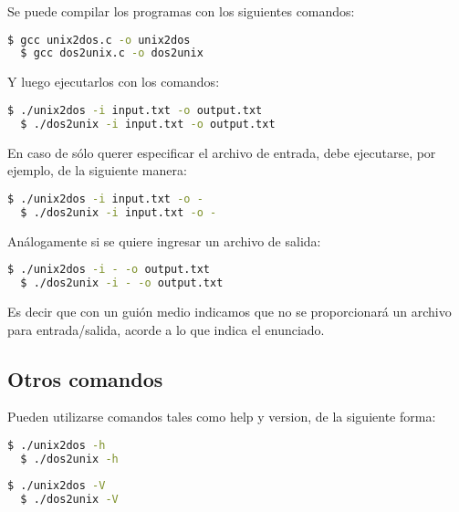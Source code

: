 \documentclass[a4paper]{article}
\begin{document}
Se puede compilar los programas con los siguientes comandos:

\begin{lstlisting}[language=bash]
  $ gcc unix2dos.c -o unix2dos
  $ gcc dos2unix.c -o dos2unix
\end{lstlisting}


Y luego ejecutarlos con los comandos:

\begin{lstlisting}[language=bash]
  $ ./unix2dos -i input.txt -o output.txt
  $ ./dos2unix -i input.txt -o output.txt
\end{lstlisting}

En caso de sólo querer especificar el archivo de entrada, debe ejecutarse, por ejemplo, de la siguiente manera:

\begin{lstlisting}[language=bash]
  $ ./unix2dos -i input.txt -o -
  $ ./dos2unix -i input.txt -o -
\end{lstlisting}

Análogamente si se quiere ingresar un archivo de salida:

\begin{lstlisting}[language=bash]
  $ ./unix2dos -i - -o output.txt
  $ ./dos2unix -i - -o output.txt
\end{lstlisting}

Es decir que con un guión medio indicamos que no se proporcionará un archivo para entrada/salida, acorde a lo que indica el enunciado.

\subsection{Otros comandos}

Pueden utilizarse comandos tales como help y version, de la siguiente forma:

\begin{lstlisting}[language=bash]
  $ ./unix2dos -h
  $ ./dos2unix -h
\end{lstlisting}

\begin{lstlisting}[language=bash]
  $ ./unix2dos -V
  $ ./dos2unix -V
\end{lstlisting}
\end{document}
